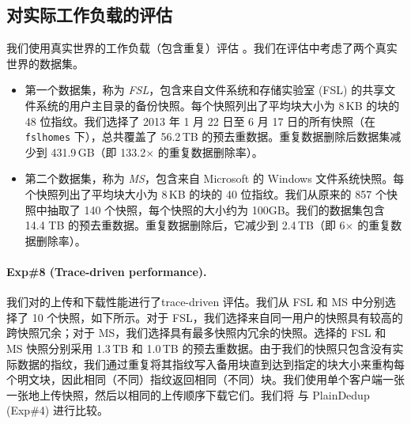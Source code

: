 \subsection{对实际工作负载的评估}
\label{subsec:real-world}

我们使用真实世界的工作负载（包含重复）评估 \sysname。我们在评估中考虑了两个真实世界的数据集。
\begin{itemize}[leftmargin=*]
\item 第一个数据集，称为 \textit{ FSL}，包含来自文件系统和存储实验室 (FSL) \cite{fsl,sun16} 的共享文件系统的用户主目录的备份快照。每个快照列出了平均块大小为 8\,KB 的块的 48 位指纹。我们选择了 2013 年 1 月 22 日至 6 月 17 日的所有快照（在 \texttt{fslhomes} 下），总共覆盖了 56.2\,TB 的预去重数据。重复数据删除后数据集减少到 431.9\,GB（即 133.2$\times$ 的重复数据删除率）。
\item 第二个数据集，称为 \textit{ MS}，包含来自 Microsoft \cite{meyer11} 的 Windows 文件系统快照。每个快照列出了平均块大小为 8\,KB 的块的 40 位指纹。我们从原来的 857 个快照中抽取了 140 个快照，每个快照的大小约为 100GB。我们的数据集包含 14.4 TB 的预去重数据。重复数据删除后，它减少到 2.4\,TB（即 6$\times$ 的重复数据删除率）。
\end{itemize}



\paragraph{Exp\#8 (Trace-driven performance).} 我们对\sysname 的上传和下载性能进行了trace-driven 评估。我们从 FSL 和 MS 中分别选择了 10 个快照，如下所示。对于 FSL，我们选择来自同一用户的快照具有较高的跨快照冗余；对于 MS，我们选择具有最多快照内冗余的快照。选择的 FSL 和 MS 快照分别采用 1.3\,TB 和 1.0\,TB 的预去重数据。由于我们的快照只包含没有实际数据的指纹，我们通过重复将其指纹写入备用块直到达到指定的块大小来重构每个明文块，因此相同（不同）指纹返回相同（不同）块。我们使用单个客户端一张一张地上传快照，然后以相同的上传顺序下载它们。我们将 \sysname 与 PlainDedup (Exp\#4) 进行比较。

